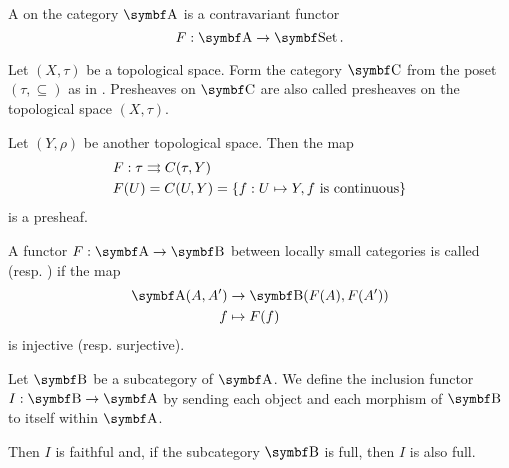 \begin{definition}\label{def:presheaf}\cite[definition 1.2.15]{Leinster2014}
  A  on the category \( \Cat{A} \) is a contravariant functor
  \begin{equation*}
    F: \Cat{A} \to \Cat{Set}.
  \end{equation*}
\end{definition}

\begin{example}\label{ex:topological_space_presheaf}\cite[24]{Leinster2014}
  Let \( (X, \tau) \) be a topological space. Form the category \( \Bold C \) from the poset \( (\tau, \subseteq) \) as in . Presheaves on \( \Bold C \) are also called presheaves on the topological space \( (X, \tau) \).

  Let \( (Y, \rho) \) be another topological space. Then the map
  \begin{align*}
    &F: \tau \rightrightarrows C(\tau, Y) \\
    &F(U) = C(U, Y) = \{ f: U \mapsto Y, f \text{ is continuous} \}
  \end{align*}
  is a presheaf.
\end{example}

\begin{definition}\label{def:faithful_full_functor}\cite[definition 1.2.16]{Leinster2014}
  A functor \( F: \Cat{A} \to \Cat{B} \) between locally small categories is called  (resp. ) if the map
  \begin{align*}
    \Cat{A}(A, A') &\to \Bold{B}(F(A), F(A')) \\
    f &\mapsto F(f)
  \end{align*}
  is injective (resp. surjective).
\end{definition}

\begin{example}\label{def:subcategory_functors}\cite[25]{Leinster2014}
  Let \( \Cat{B} \) be a subcategory of \( \Cat{A} \). We define the inclusion functor \( I: \Cat{B} \to \Cat{A} \) by sending each object and each morphism of \( \Cat{B} \) to itself within \( \Cat{A} \).

  Then \( I \) is faithful and, if the subcategory \( \Cat{B} \) is full, then \( I \) is also full.
\end{example}

